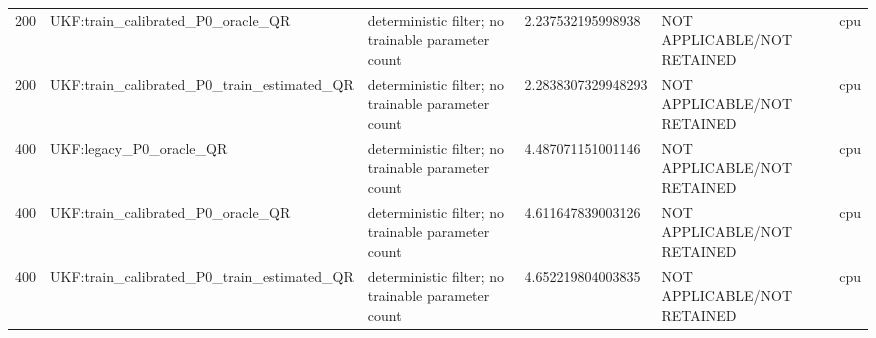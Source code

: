 \begin{table}[t]
\begin{tabular}{llllll}
200 & UKF:train\_calibrated\_P0\_oracle\_QR & deterministic filter; no trainable parameter count & 2.237532195998938 & NOT APPLICABLE/NOT RETAINED & cpu \\
200 & UKF:train\_calibrated\_P0\_train\_estimated\_QR & deterministic filter; no trainable parameter count & 2.2838307329948293 & NOT APPLICABLE/NOT RETAINED & cpu \\
400 & UKF:legacy\_P0\_oracle\_QR & deterministic filter; no trainable parameter count & 4.487071151001146 & NOT APPLICABLE/NOT RETAINED & cpu \\
400 & UKF:train\_calibrated\_P0\_oracle\_QR & deterministic filter; no trainable parameter count & 4.611647839003126 & NOT APPLICABLE/NOT RETAINED & cpu \\
400 & UKF:train\_calibrated\_P0\_train\_estimated\_QR & deterministic filter; no trainable parameter count & 4.652219804003835 & NOT APPLICABLE/NOT RETAINED & cpu \\
\hline
\end{tabular}
\end{table}

